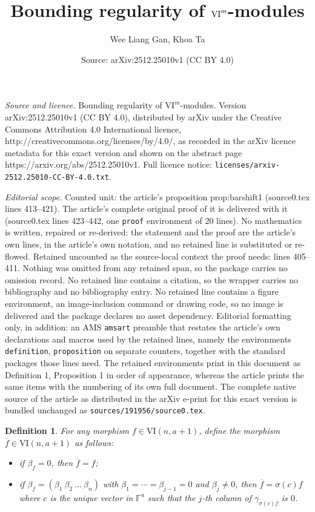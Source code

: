 \documentclass[10pt,a4paper]{amsart}
\title{Bounding regularity of $\VI^m$-modules}
\author{Wee Liang Gan, Khoa Ta}
\date{Source: arXiv:2512.25010v1 (CC BY 4.0)}
\newtheorem{definition}{Definition}
\newcommand{\F}{{\mathbb{F}}}
\newcommand{\VI}{{\mathrm{VI}}}
\begin{document}
\maketitle

\noindent\emph{Source and licence.} Bounding regularity of $\VI^m$-modules. Version arXiv:2512.25010v1 (CC BY 4.0), distributed by arXiv under the Creative Commons Attribution 4.0 International licence, http://creativecommons.org/licenses/by/4.0/, as recorded in the arXiv licence metadata for this exact version and shown on the abstract page https://arxiv.org/abs/2512.25010v1. Full licence notice: \texttt{licenses/arxiv-2512.25010-CC-BY-4.0.txt}.\par\smallskip

\noindent\textit{Editorial scope.} Counted unit: the article's proposition prop:barshift1 (source0.tex lines 413--421). The article's complete original proof of it is delivered with it (source0.tex lines 423--442, one \texttt{proof} environment of 20 lines). No mathematics is written, repaired or re-derived: the statement and the proof are the article's own lines, in the article's own notation, and no retained line is substituted or re-flowed.  Retained uncounted as the source-local context the proof needs: lines 405--411.  Nothing was omitted from any retained span, so the package carries no omission record.  No retained line contains a citation, so the wrapper carries no bibliography and no bibliography entry.  No retained line contains a figure environment, an image-inclusion command or drawing code, so no image is delivered and the package declares no asset dependency.  Editorial formatting only, in addition: an AMS \texttt{amsart} preamble that restates the article's own declarations and macros used by the retained lines, namely the environments \texttt{definition}, \texttt{proposition} on separate counters, together with the standard packages those lines need.  The retained environments print in this document as Definition 1, Proposition 1 in order of appearance, whereas the article prints the same items with the numbering of its own full document.  The complete native source of the article as distributed in the arXiv e-print for this exact version is bundled unchanged as \texttt{sources/191956/source0.tex}.
\begin{definition} \label{def:reduced_form}
   For any morphism $f\in \VI(n,a+1)$, define the morphism $\overline{f}\in \VI(n,a+1)$ as follows:
   \begin{itemize}
      \item if $\beta_f=0$, then $\overline{f}=f$;
      \item if $\beta_f=(\beta_1 \ \beta_2 \ \ldots \ \beta_n)$ with $\beta_1=\cdots=\beta_{j-1}=0$ and $\beta_j\neq 0$, then $\overline{f}=\sigma(c)f$ where $c$ is the unique vector in $\F^a$ such that the $j$-th column of $\gamma_{\sigma(c)f}$ is $0$.
   \end{itemize}    
\end{definition}
\end{document}
